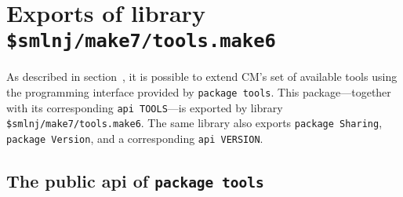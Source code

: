 
\section{Exports of library {\tt \$smlnj/make7/tools.make6}}

As described in section~, it is possible to extend
CM's set of available tools using the programming interface provided
by {\tt package tools}.  This package---together with its
corresponding {\tt api TOOLS}---is exported by library {\tt
\$smlnj/make7/tools.make6}.  The same library also exports {\tt package
Sharing}, {\tt package Version}, and a corresponding {\tt api
VERSION}.

\subsection{The public api of {\tt package tools}}

